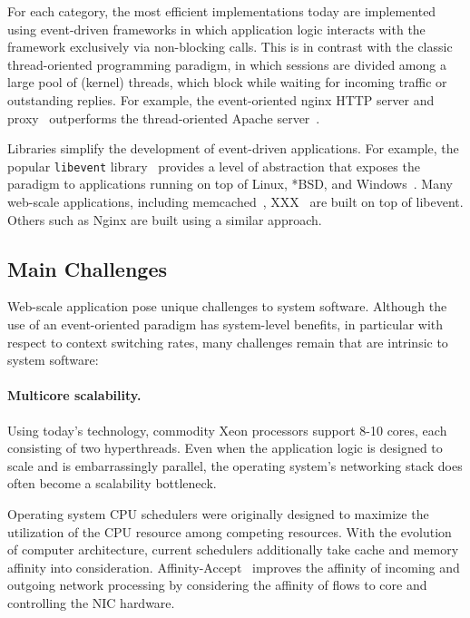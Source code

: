 For each category, the most efficient implementations today are
implemented using event-driven frameworks in which application logic
interacts with the framework exclusively via non-blocking calls.  This
is in contrast with the classic thread-oriented programming paradigm,
in which sessions are divided among a large pool of (kernel)
threads, which block while waiting for incoming traffic or outstanding
replies.  For example, the event-oriented nginx HTTP
server and proxy~\cite{reese2008nginx} outperforms the thread-oriented Apache server~\cite{misc:apache}.

Libraries simplify the development of event-driven applications.  For
example, the popular \texttt{libevent} library~\cite{misc:libevent} provides a level of
abstraction that exposes the paradigm to applications running on top
of Linux, *BSD, and Windows~\cite{missing}.  Many web-scale
applications, including memcached~\cite{missing}, XXX~\cite{missing} are built on top
of libevent.  Others such as Nginx are built using a similar approach.


\subsection{Main Challenges}
\label{sec:motivation:challenges}

Web-scale application pose unique challenges to system software.
Although the use of an event-oriented paradigm has system-level
benefits, in particular with respect to context switching rates, many
challenges remain that are intrinsic to system software:

\paragraph{Multicore scalability.}

Using today's technology, commodity Xeon processors support 8-10
cores, each consisting of two hyperthreads.  Even when the application
logic is designed to scale and is embarrassingly parallel, the
operating system's networking stack does often become a scalability
bottleneck.

Operating system CPU schedulers were originally designed to
maximize the utilization of the CPU resource among competing
resources.  With the evolution of computer architecture, current
schedulers additionally take cache and memory affinity into
consideration.  Affinity-Accept~\cite{DBLP:conf/eurosys/PesterevSZM12}
improves the affinity of incoming and outgoing network processing by
considering the affinity of flows to core and controlling the NIC
hardware.

